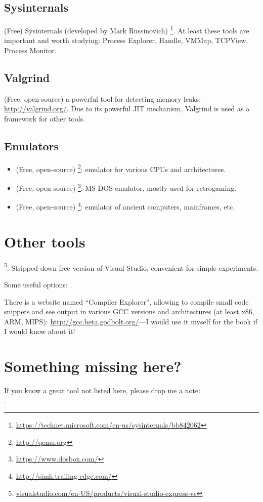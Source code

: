 \subsection{Sysinternals}

(Free) Sysinternals (developed by Mark Russinovich)
\footnote{\url{https://technet.microsoft.com/en-us/sysinternals/bb842062}}.
At least these tools are important and worth studying: Process Explorer, Handle, VMMap, TCPView, Process Monitor.

\subsection{Valgrind}

(Free, open-source) a powerful tool for detecting memory leaks: \url{http://valgrind.org/}.
Due to its powerful \ac{JIT} mechanism, Valgrind is used as a framework for other tools.


\subsection{Emulators}

\begin{itemize}
\item (Free, open-source) \footnote{\url{http://qemu.org}}: emulator for various CPUs and architectures.

\item (Free, open-source) \footnote{\url{https://www.dosbox.com/}}: MS-DOS emulator, mostly used for retrogaming.

\item (Free, open-source) \footnote{\url{http://simh.trailing-edge.com/}}: emulator of ancient computers, mainframes, etc.
\end{itemize}

\section{Other tools}

\footnote{\href{http://go.yurichev.com/17034}{visualstudio.com/en-US/products/visual-studio-express-vs}}:
Stripped-down free version of Visual Studio, convenient for simple experiments.

Some useful options: .

There is a website named ``Compiler Explorer'', allowing to compile small code snippets and see output
in various GCC versions and architectures
(at least x86, ARM, MIPS): \url{http://gcc.beta.godbolt.org/}---I would use it myself for the book if I would know about it!

\section{Something missing here?}

If you know a great tool not listed here, please drop me a note:\\
\TT{\EMAIL}.

